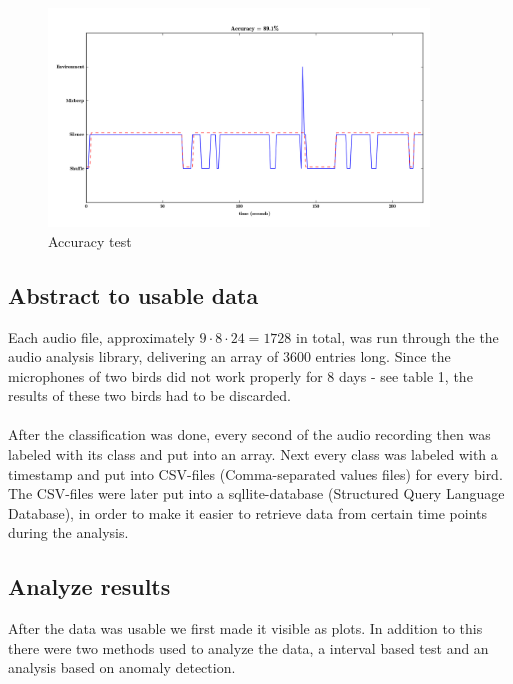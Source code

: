 \documentclass[a4paper]{article}
\begin{document}
\begin{figure}[!ht]
  \centering
    \includegraphics[width=0.9\textwidth]{accuracy_test_crop}
      \caption{Accuracy test}
\end{figure}


\subsection*{Abstract to usable data}
Each audio file, approximately $9\cdot8\cdot24=1728$ in total, was run through the the audio analysis library, delivering an array of 3600 entries long. Since the microphones of two birds did not work properly for 8 days - see table 1, the results of these two birds had to be discarded. \\ \\ 
After the classification was done, every second of the audio recording then was labeled with its class and put into an array. Next every class was labeled with a timestamp and put into CSV-files (Comma-separated values files) for every bird. The CSV-files were later put into a sqllite-database (Structured Query Language Database), in order to make it easier to retrieve data from certain time points during the analysis.

\subsection*{Analyze results}
After the data was usable we first made it visible as plots. In addition to this there were two methods used to analyze the data, a interval based test and an analysis based on anomaly detection. 

\end{document}
